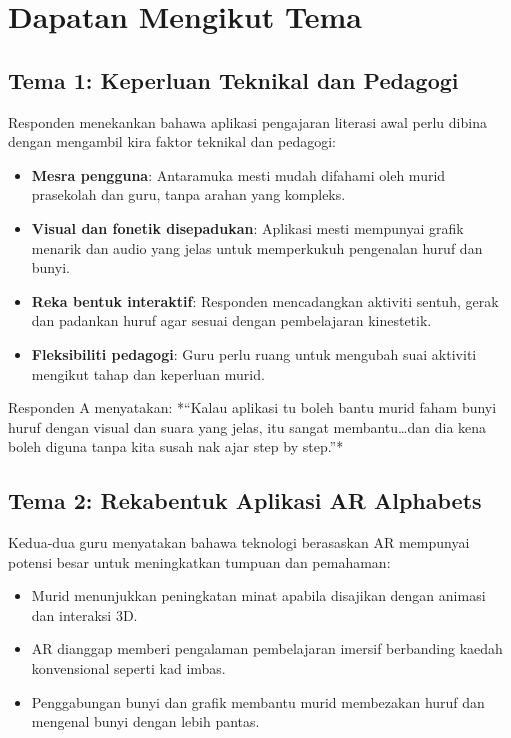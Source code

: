 {{\vspace{0.5cm}
\section*{Dapatan Mengikut Tema}

\subsection*{Tema 1: Keperluan Teknikal dan Pedagogi}
Responden menekankan bahawa aplikasi pengajaran literasi awal perlu dibina dengan mengambil kira faktor teknikal dan pedagogi:

\begin{itemize}
    \item \textbf{Mesra pengguna}: Antaramuka mesti mudah difahami oleh murid prasekolah dan guru, tanpa arahan yang kompleks.
    \item \textbf{Visual dan fonetik disepadukan}: Aplikasi mesti mempunyai grafik menarik dan audio yang jelas untuk memperkukuh pengenalan huruf dan bunyi.
    \item \textbf{Reka bentuk interaktif}: Responden mencadangkan aktiviti sentuh, gerak dan padankan huruf agar sesuai dengan pembelajaran kinestetik.
    \item \textbf{Fleksibiliti pedagogi}: Guru perlu ruang untuk mengubah suai aktiviti mengikut tahap dan keperluan murid.
\end{itemize}

Responden A menyatakan: *“Kalau aplikasi tu boleh bantu murid faham bunyi huruf dengan visual dan suara yang jelas, itu sangat membantu…dan dia kena boleh diguna tanpa kita susah nak ajar step by step.”*

\vspace{0.3cm}
\subsection*{Tema 2: Rekabentuk Aplikasi AR Alphabets}
Kedua-dua guru menyatakan bahawa teknologi berasaskan AR mempunyai potensi besar untuk meningkatkan tumpuan dan pemahaman:

\begin{itemize}[label=--]
    \item Murid menunjukkan peningkatan minat apabila disajikan dengan animasi dan interaksi 3D.
    \item AR dianggap memberi pengalaman pembelajaran imersif berbanding kaedah konvensional seperti kad imbas.
    \item Penggabungan bunyi dan grafik membantu murid membezakan huruf dan mengenal bunyi dengan lebih pantas.
\end{itemize}

}}
